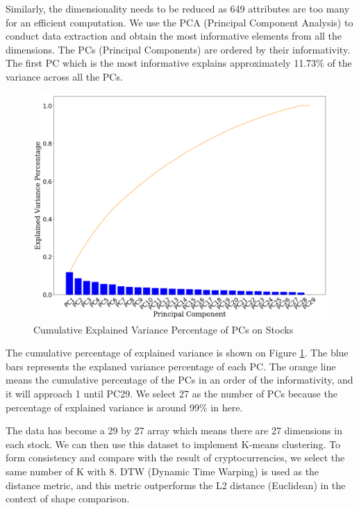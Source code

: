 \documentclass[11pt]{article} %
\theoremstyle{plain}
\theoremstyle{definition}
\begin{document}
Similarly, the dimensionality needs to be reduced as 649 attributes are too many for an efficient computation. We use the PCA (Principal Component Analysis) to conduct data extraction and obtain the most informative elements from all the dimensions. The PCs (Principal Components) are ordered by their informativity. The first PC which is the most informative explains approximately 11.73\% of the variance across all the PCs.

\begin{figure}[ht]
    \includegraphics[width=1\linewidth, center]{resources/stock_pca_explained.png}
    \caption{Cumulative Explained Variance Percentage of PCs on Stocks}
    \label{fig:stockpca}
\end{figure}

The cumulative percentage of explained variance is shown on Figure \ref{fig:stockpca}. The blue bars represents the explaned variance percentage of each PC. The orange line means the cumulative percentage of the PCs in an order of the informativity, and it will approach 1 until PC29. We select 27 as the number of PCs because the percentage of explained variance is around 99\% in here.

The data has become a 29 by 27 array which means there are 27 dimensions in each stock. We can then use this dataset to implement K-means clustering. To form consistency and compare with the result of cryptocurrencies, we select the same number of K with 8. DTW (Dynamic Time Warping) is used as the distance metric, and this metric outperforms the L2 distance (Euclidean) in the context of shape comparison.
\end{document}
